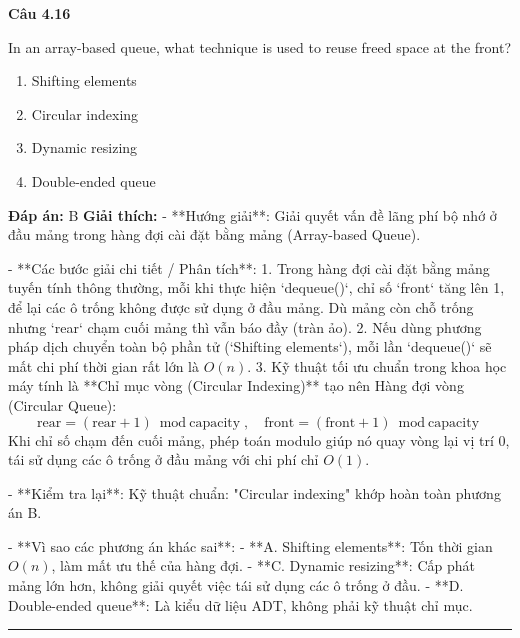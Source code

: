\documentclass[11pt,a4paper]{article}
\newenvironment{question}[1]{%
  \par\vspace{1em}\noindent\textbf{\large Câu #1}\par\vspace{0.4em}
}{%
  \par\vspace{1em}\hrule\vspace{0.6em}
}
\newenvironment{choices}{%
  \begin{enumerate}[label=\textbf{\Alph*.},leftmargin=2.2em,itemsep=2pt,topsep=3pt]
}{%
  \end{enumerate}
}
\newcommand{\choice}{\item}
\begin{document}
\begin{question}{4.16}
In an array-based queue, what technique is used to reuse freed space at the front?
\begin{choices}
\choice Shifting elements
\choice Circular indexing
\choice Dynamic resizing
\choice Double-ended queue
\end{choices}
\textbf{Đáp án:} B
\textbf{Giải thích:} - **Hướng giải**:
  Giải quyết vấn đề lãng phí bộ nhớ ở đầu mảng trong hàng đợi cài đặt bằng mảng (Array-based Queue).

- **Các bước giải chi tiết / Phân tích**:
  1. Trong hàng đợi cài đặt bằng mảng tuyến tính thông thường, mỗi khi thực hiện `dequeue()`, chỉ số `front` tăng lên 1, để lại các ô trống không được sử dụng ở đầu mảng. Dù mảng còn chỗ trống nhưng `rear` chạm cuối mảng thì vẫn báo đầy (tràn ảo).
  2. Nếu dùng phương pháp dịch chuyển toàn bộ phần tử (`Shifting elements`), mỗi lần `dequeue()` sẽ mất chi phí thời gian rất lớn là \(O(n)\).
  3. Kỹ thuật tối ưu chuẩn trong khoa học máy tính là **Chỉ mục vòng (Circular Indexing)** tạo nên Hàng đợi vòng (Circular Queue):
     \[
     \text{rear} = (\text{rear} + 1) \bmod \text{capacity}, \quad \text{front} = (\text{front} + 1) \bmod \text{capacity}
     \]
     Khi chỉ số chạm đến cuối mảng, phép toán modulo giúp nó quay vòng lại vị trí 0, tái sử dụng các ô trống ở đầu mảng với chi phí chỉ \(O(1)\).

- **Kiểm tra lại**:
  Kỹ thuật chuẩn: "Circular indexing" khớp hoàn toàn phương án B.

- **Vì sao các phương án khác sai**:
  - **A. Shifting elements**: Tốn thời gian \(O(n)\), làm mất ưu thế của hàng đợi.
  - **C. Dynamic resizing**: Cấp phát mảng lớn hơn, không giải quyết việc tái sử dụng các ô trống ở đầu.
  - **D. Double-ended queue**: Là kiểu dữ liệu ADT, không phải kỹ thuật chỉ mục.
\end{question}
\end{document}
